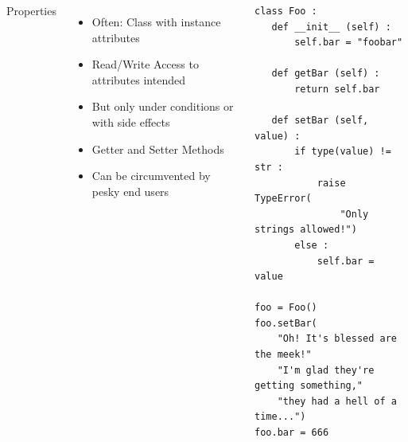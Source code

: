 \begin{frame}[fragile]
%
\begin{columns}[T]
\begin{Large}
	{Properties}
	\vspace{12pt}
\end{Large}
%
\begin{itemize}
\item Often: Class with instance attributes
\item Read/Write Access to attributes intended
\item But only under conditions or with side effects
\item[\Thus] Getter and Setter Methods
\item Can be circumvented by pesky end users
\end{itemize}
%
\begin{codebox}
\begin{verbatim}
class Foo :
   def __init__ (self) :
       self.bar = "foobar"
   
   def getBar (self) :
       return self.bar
   
   def setBar (self, value) :
       if type(value) != str :
           raise TypeError(
               "Only strings allowed!")
       else :
           self.bar = value

foo = Foo()
foo.setBar(
    "Oh! It's blessed are the meek!"
    "I'm glad they're getting something,"
    "they had a hell of a time...")
foo.bar = 666
\end{verbatim}
\end{codebox}
\end{columns}
%
\end{frame}


